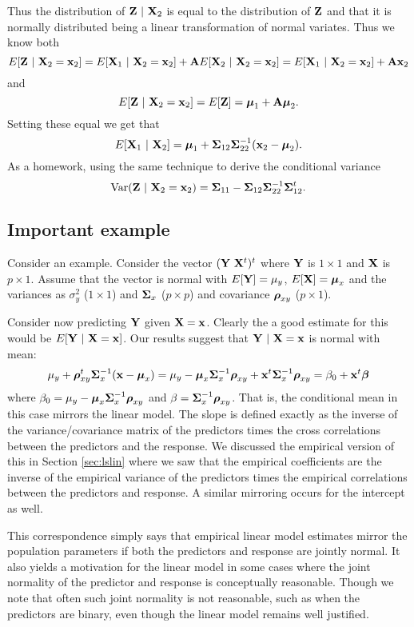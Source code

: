 Thus the distribution of $\mathbf{Z} ~|~ \mathbf{X}_2$ is equal
to the distribution of $\mathbf{Z}$ and that it is normally distributed
being a linear transformation of normal variates. Thus we know both
$$
E[\mathbf{Z} ~|~ \mathbf{X}_2 = \mathbf{x}_2] = E[\mathbf{X}_1 ~|~ \mathbf{X}_2 = \mathbf{x}_2] + \mathbf{A} E[\mathbf{X}_2 ~|~ \mathbf{X}_2 = \mathbf{x}_2]
= E[\mathbf{X}_1 ~|~ \mathbf{X}_2 = \mathbf{x}_2] + \mathbf{A} \mathbf{x}_2
$$
and
$$
E[\mathbf{Z} ~|~ \mathbf{X}_2 = \mathbf{x}_2] = E[\mathbf{Z}] = \boldsymbol{\mu}_1 + \mathbf{A} \boldsymbol{\mu}_2.
$$
Setting these equal we get that
$$
E[\mathbf{X}_1 ~|~ \mathbf{X}_2] = \boldsymbol{\mu}_1 + \boldsymbol{\Sigma}_{12}\boldsymbol{\Sigma}_{22}^{-1} (\mathbf{x}_2 - \boldsymbol{\mu}_2).
$$
As a homework, using the same technique to derive the conditional variance
$$
\mbox{Var}(\mathbf{Z} ~|~ \mathbf{X}_2 = \mathbf{x}_2) = \boldsymbol{\Sigma}_{11} - \boldsymbol{\Sigma}_{12} \boldsymbol{\Sigma}_{22}^{-1} \boldsymbol{\Sigma}_{12}^t.
$$

\subsection{Important example}
Consider an example. Consider the vector 
$(\mathbf{Y} ~ \mathbf{X}^t)^t$ where $\mathbf{Y}$ is $1\times 1$ and $\mathbf{X}$ is $p\times 1$. Assume that 
the vector is normal with $E[\mathbf{Y}] = \mu_y$, $E[\mathbf{X}] = \boldsymbol{\mu}_x$ and the variances
as $\sigma^2_y$ ($1\times 1$) and $\boldsymbol{\Sigma}_x$ ($p\times p$) 
and covariance $\boldsymbol{\rho}_{xy}$ ($p \times 1$).

Consider now predicting $\mathbf{Y}$ given $\mathbf{X} = \mathbf{x}$. Clearly the a good estimate
for this would be $E[\mathbf{Y} ~|~ \mathbf{X} = \mathbf{x}]$. Our results
suggest that $\mathbf{Y} ~|~ \mathbf{X} = \mathbf{x}$ is normal with mean:
$$
\mu_y + \boldsymbol{\rho}_{xy}^t\boldsymbol{\Sigma}_x^{-1} (\mathbf{x} - \boldsymbol{\mu}_x)
= \mu_y - \boldsymbol{\mu}_x \boldsymbol{\Sigma}_x^{-1}\boldsymbol{\rho}_{xy} + \mathbf{x}^t \boldsymbol{\Sigma}_x^{-1} \boldsymbol{\rho}_{xy}
= \beta_0 + \mathbf{x}^t \boldsymbol{\beta}
$$
where $\beta_0 = \mu_y - \boldsymbol{\mu}_x \boldsymbol{\Sigma}_x^{-1}\boldsymbol{\rho}_{xy}$ and $\beta = \boldsymbol{\Sigma}_x^{-1} \boldsymbol{\rho}_{xy}$. That is, the conditional mean in this case mirrors the
linear model. The slope is defined exactly as the inverse of the variance/covariance matrix
of the predictors times the cross correlations between the predictors and the response.
We discussed the empirical version of this in Section \ref{sec:lslin} where we
saw that the empirical coefficients are the inverse of the empirical variance of 
the predictors times the empirical correlations between the predictors and response. 
A similar mirroring occurs for the intercept as well. 

This correspondence simply says that empirical linear model estimates mirror the population parameters if both the predictors and response are jointly normal. It also yields
a motivation for the linear model in some cases where the joint normality of the
predictor and response is conceptually reasonable. Though we note that often such
joint normality is not reasonable, such as when the predictors are binary, even
though the linear model remains well justified. 


